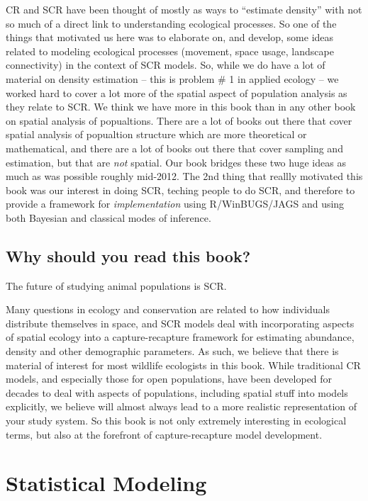 CR and SCR have been thought of mostly as ways to ``estimate density''
with not so much of a direct link to understanding ecological
processes. So one of the things that motivated us here was to
elaborate on, and develop, some ideas related to modeling ecological
processes (movement, space usage, landscape connectivity) in the
context of SCR models.  So, while we do have a lot of material on
density estimation -- this is problem \# 1 in applied ecology -- we
worked hard to cover a lot more of the spatial aspect of population
analysis as they relate to SCR. We think we have more in this book
than in any other book on spatial analysis of popualtions. There are a
lot of books out there that cover spatial analysis of popualtion
structure which are more theoretical or mathematical, and there are a
lot of books out there that cover sampling and estimation, but that
are {\it not} spatial. Our book bridges these two huge ideas as much
as was possible roughly mid-2012.  The 2nd thing that reallly
motivated this book was our interest in doing SCR, teching people to
do SCR, and therefore to provide a framework for {\it implementation}
using R/WinBUGS/JAGS and using both Bayesian and classical modes of
inference.  


\subsection*{Why should you read this book?} 

The future of studying animal populations is SCR.  

Many questions in ecology and conservation are related to 
how individuals distribute themselves in space, and SCR models deal 
with incorporating aspects of spatial ecology into a capture-recapture 
framework for estimating abundance, density and other demographic 
parameters. As such, we believe that there is material of interest for 
most wildlife ecologists in this book. While traditional CR models, 
and especially those for open populations, have been developed for 
decades to deal with aspects of populations, including spatial stuff 
into models explicitly, we believe will almost always lead to a more 
realistic representation of your study system.  So this book is not 
only extremely interesting in ecological terms, but also at the 
forefront of capture-recapture model development. 


\section*{Statistical Modeling}

